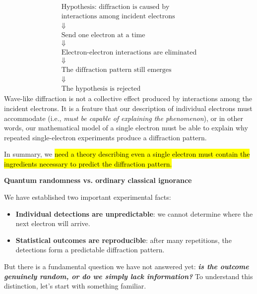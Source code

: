 \begin{takeawaysbox}
    \begin{equation*}
        \begin{gathered}
            \text{Hypothesis: diffraction is caused by}\\
            \text{interactions among incident electrons}\\
            \Downarrow\\
            \text{Send one electron at a time}\\
            \Downarrow\\
            \text{Electron-electron interactions are eliminated}\\
            \Downarrow\\
            \text{The diffraction pattern still emerges}\\
            \Downarrow\\
            \text{The hypothesis is rejected}
        \end{gathered}
    \end{equation*}
    Wave-like diffraction is not a collective effect produced by interactions among the incident electrons. It is a feature that our description of individual electrons must accommodate (i.e., \emph{must be capable of explaining the phenomenon}), or in other words, our mathematical model of a single electron must be able to explain why repeated single-electron experiments produce a diffraction pattern.

    \highspace
    In summary, we \hl{need a theory describing even a single electron must contain the ingredients necessary to predict the diffraction pattern.}
\end{takeawaysbox}

\newpage

\begin{flushleft}
    \textcolor{Green3}{ \textbf{Quantum randomness vs. ordinary classical ignorance}}
\end{flushleft}
We have established two important experimental facts:
\begin{itemize}
    \item \textbf{Individual detections are unpredictable}: we cannot determine where the next electron will arrive.
    \item \textbf{Statistical outcomes are reproducible}: after many repetitions, the detections form a predictable diffraction pattern.
\end{itemize}
But there is a fundamental question we have not answered yet: \emph{\textbf{is the outcome genuinely random, or do we simply lack information?}} To understand this distinction, let's start with something familiar.

